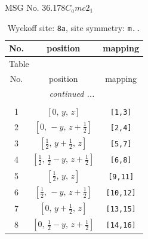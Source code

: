 \documentclass[fleqn,8pt]{jsarticle}
\begin{document}
\setcounter{MaxMatrixCols}{32}

\renewcommand{\tablename}{Table~}
\renewcommand{\figurename}{Figure~}
\begin{center}
\LARGE
MSG No. 36.178\quad$C_{a}mc2_{1}$
\end{center}
\renewcommand{\arraystretch}{1.2}
\begin{longtable}{ccc}
\caption{Wyckoff site: {\tt 8a}, site symmetry: {\tt m..}}
 \\
 \hline \hline
No. & position & mapping \\ \hline \endfirsthead

\multicolumn{2}{l}{\tablename\ \thetable{}} \\
 \hline \hline
No. & position & mapping \\ \hline \endhead

 \hline \hline
\multicolumn{2}{r}{\footnotesize\it continued ...} \\ \endfoot

 \hline \hline
\multicolumn{2}{r}{} \\ \endlastfoot

1 & $\left[ 0,\, y,\, z \right]$ & {\tt [1,3]} \\ \hline
2 & $\left[ 0,\, - y,\, z + \frac{1}{2} \right]$ & {\tt [2,4]} \\ \hline
3 & $\left[ \frac{1}{2},\, y + \frac{1}{2},\, z \right]$ & {\tt [5,7]} \\ \hline
4 & $\left[ \frac{1}{2},\, \frac{1}{2} - y,\, z + \frac{1}{2} \right]$ & {\tt [6,8]} \\ \hline
5 & $\left[ \frac{1}{2},\, y,\, z \right]$ & {\tt [9,11]} \\ \hline
6 & $\left[ \frac{1}{2},\, - y,\, z + \frac{1}{2} \right]$ & {\tt [10,12]} \\ \hline
7 & $\left[ 0,\, y + \frac{1}{2},\, z \right]$ & {\tt [13,15]} \\ \hline
8 & $\left[ 0,\, \frac{1}{2} - y,\, z + \frac{1}{2} \right]$ & {\tt [14,16]} \\
\end{longtable}
\renewcommand{\arraystretch}{1.2}
\end{document}
